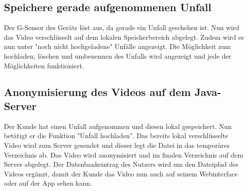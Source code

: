 \subsection{Speichere gerade aufgenommenen Unfall}
Der G-Sensor des Ger\"ats l\"ost aus, da gerade ein Unfall geschehen ist. Nun wird das Video verschl\"usselt auf dem lokalen Speicherbereich abgelegt. Zudem wird es nun unter "noch nicht hochgeladene" Unf\"alle angezeigt. Die M\"oglichkeit zum hochladen, l\"oschen und umbenennen des Unfalls wird angezeigt und jede der M\"oglichkeiten funktioniert.

\subsection{Anonymisierung des Videos auf dem Java-Server}
Der Kunde hat einen Unfall aufgenommen und diesen lokal gespeichert. Nun bet\"atigt er die Funktion "Unfall hochladen". Das bereits lokal verschl\"usselte Video wird zum Server gesendet und dieser legt die Datei in das tempor\"ares Verzeichnis ab. Das Video wird anonymisiert und im finalen Verzeichnis auf dem Server abgelegt. Der Datenbankeintrag des Nutzers wird um den Dateipfad des Videos erg\"anzt, damit der Kunde das Video nun auch auf seinem Webinterface oder auf der App sehen kann.